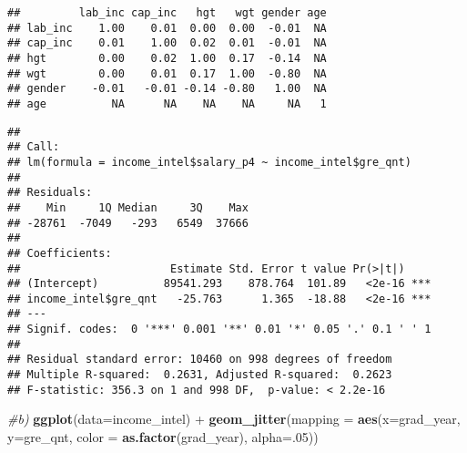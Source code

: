 \documentclass[]{article}
\newenvironment{Shaded}{\begin{snugshade}}{\end{snugshade}}
\newcommand{\KeywordTok}[1]{\textcolor[rgb]{0.13,0.29,0.53}{\textbf{{#1}}}}
\newcommand{\DataTypeTok}[1]{\textcolor[rgb]{0.13,0.29,0.53}{{#1}}}
\newcommand{\DecValTok}[1]{\textcolor[rgb]{0.00,0.00,0.81}{{#1}}}
\newcommand{\StringTok}[1]{\textcolor[rgb]{0.31,0.60,0.02}{{#1}}}
\newcommand{\CommentTok}[1]{\textcolor[rgb]{0.56,0.35,0.01}{\textit{{#1}}}}
\newcommand{\NormalTok}[1]{{#1}}
\begin{document}
\begin{verbatim}
##         lab_inc cap_inc   hgt   wgt gender age
## lab_inc    1.00    0.01  0.00  0.00  -0.01  NA
## cap_inc    0.01    1.00  0.02  0.01  -0.01  NA
## hgt        0.00    0.02  1.00  0.17  -0.14  NA
## wgt        0.00    0.01  0.17  1.00  -0.80  NA
## gender    -0.01   -0.01 -0.14 -0.80   1.00  NA
## age          NA      NA    NA    NA     NA   1
\end{verbatim}

\begin{Shaded}
\end{Shaded}

\begin{verbatim}
## 
## Call:
## lm(formula = income_intel$salary_p4 ~ income_intel$gre_qnt)
## 
## Residuals:
##    Min     1Q Median     3Q    Max 
## -28761  -7049   -293   6549  37666 
## 
## Coefficients:
##                       Estimate Std. Error t value Pr(>|t|)    
## (Intercept)          89541.293    878.764  101.89   <2e-16 ***
## income_intel$gre_qnt   -25.763      1.365  -18.88   <2e-16 ***
## ---
## Signif. codes:  0 '***' 0.001 '**' 0.01 '*' 0.05 '.' 0.1 ' ' 1
## 
## Residual standard error: 10460 on 998 degrees of freedom
## Multiple R-squared:  0.2631, Adjusted R-squared:  0.2623 
## F-statistic: 356.3 on 1 and 998 DF,  p-value: < 2.2e-16
\end{verbatim}

\begin{Shaded}
\begin{Highlighting}[]
\CommentTok{#b)}
\KeywordTok{ggplot}\NormalTok{(}\DataTypeTok{data=}\NormalTok{income_intel) +}
\StringTok{  }\KeywordTok{geom_jitter}\NormalTok{(}\DataTypeTok{mapping =} \KeywordTok{aes}\NormalTok{(}\DataTypeTok{x=}\NormalTok{grad_year, }\DataTypeTok{y=}\NormalTok{gre_qnt, }\DataTypeTok{color =} \KeywordTok{as.factor}\NormalTok{(grad_year), }\DataTypeTok{alpha=}\NormalTok{.}\DecValTok{05}\NormalTok{))}
\end{Highlighting}
\end{Shaded}
\end{document}
